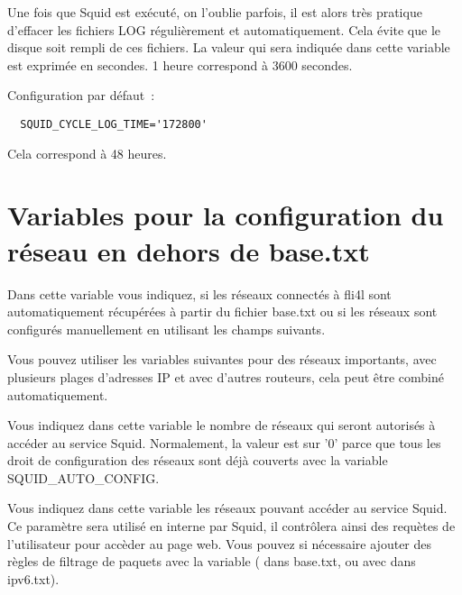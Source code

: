 \begin{description}

                Une fois que Squid est exécuté, on l'oublie parfois, il est alors
                très pratique d'effacer les fichiers LOG régulièrement et
                automatiquement. Cela évite que le disque soit rempli de
                ces fichiers. La valeur qui sera indiquée dans cette variable
                est exprimée en secondes. 1 heure correspond à 3600 secondes.

                Configuration par défaut~:
\begin{verbatim}
  SQUID_CYCLE_LOG_TIME='172800'
\end{verbatim}

                Cela correspond à 48 heures.

\section{Variables pour la configuration du réseau en dehors de base.txt}


                Dans cette variable vous indiquez, si les réseaux connectés à
                fli4l sont automatiquement récupérées à partir du fichier
                base.txt ou si les réseaux sont configurés manuellement en
                utilisant les champs suivants.

                Vous pouvez utiliser les variables suivantes pour des réseaux
                importants, avec plusieurs plages d'adresses IP et avec d'autres
                routeurs, cela peut être combiné automatiquement.



                Vous indiquez dans cette variable le nombre de réseaux qui seront
                autorisés à accéder au service Squid. Normalement, la valeur est
                sur '0' parce que tous les droit de configuration des réseaux
                sont déjà couverts avec la variable SQUID\_AUTO\_CONFIG.



                Vous indiquez dans cette variable les réseaux pouvant accéder
                au service Squid. Ce paramètre sera utilisé en interne par Squid,
				il contrôlera ainsi des requètes de l'utilisateur pour accèder
				au page web. Vous pouvez si nécessaire ajouter des règles de filtrage
				de paquets avec la variable ( dans base.txt, ou avec
				 dans ipv6.txt).


\end{description}
